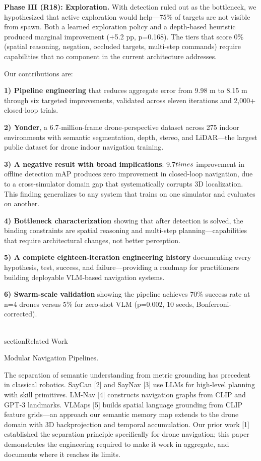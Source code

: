 \documentclass[conference]{IEEEtran}
\begin{document}
\textbf{Phase III (R18): Exploration.} With detection ruled out as the
bottleneck, we hypothesized that active exploration would help---75\% of
targets are not visible from spawn. Both a learned exploration policy
and a depth-based heuristic produced marginal improvement (+5.2 pp,
p=0.168). The tiers that score 0\% (spatial reasoning, negation,
occluded targets, multi-step commands) require capabilities that no
component in the current architecture addresses.

Our contributions are:

\textbf{1) Pipeline engineering} that reduces aggregate error from 9.98
m to 8.15 m through six targeted improvements, validated across eleven
iterations and 2,000+ closed-loop trials.

\textbf{2) Yonder}, a 6.7-million-frame drone-perspective dataset
across 275 indoor environments with semantic segmentation, depth,
stereo, and LiDAR---the largest public dataset for drone indoor
navigation training.

\textbf{3) A negative result with broad implications}: 9.7$\\times$ improvement
in offline detection mAP produces zero improvement in closed-loop
navigation, due to a cross-simulator domain gap that systematically
corrupts 3D localization. This finding generalizes to any system that
trains on one simulator and evaluates on another.

\textbf{4) Bottleneck characterization} showing that after detection is
solved, the binding constraints are spatial reasoning and multi-step
planning---capabilities that require architectural changes, not better
perception.

\textbf{5) A complete eighteen-iteration engineering history}
documenting every hypothesis, test, success, and failure---providing a
roadmap for practitioners building deployable VLM-based navigation
systems.

\textbf{6) Swarm-scale validation} showing the pipeline achieves 70\%
success rate at n=4 drones versus 5\% for zero-shot VLM (p=0.002, 10
seeds, Bonferroni-corrected).

\\section{Related Work}\label{ii.-related-work}

Modular Navigation Pipelines.

The separation of semantic understanding from metric grounding has
precedent in classical robotics. SayCan [2] and SayNav [3] use
LLMs for high-level planning with skill primitives. LM-Nav [4]
constructs navigation graphs from CLIP and GPT-3 landmarks. VLMaps
[5] builds spatial language grounding from CLIP feature grids---an
approach our semantic memory map extends to the drone domain with 3D
backprojection and temporal accumulation. Our prior work [1]
established the separation principle specifically for drone navigation;
this paper demonstrates the engineering required to make it work in
aggregate, and documents where it reaches its limits.
\end{document}
